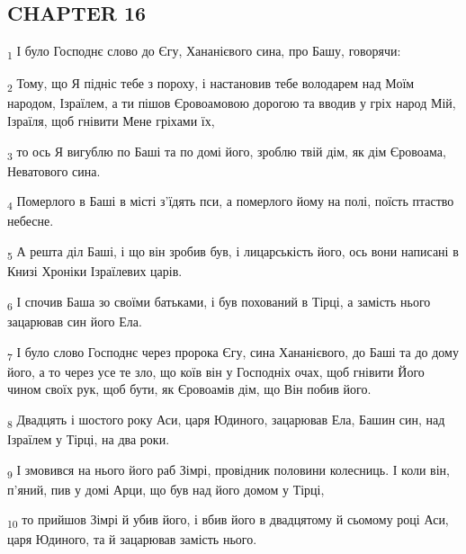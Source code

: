 \subsection{CHAPTER 16}
\begin{tcolorbox}
\textsubscript{1} І було Господнє слово до Єгу, Хананієвого сина, про Башу, говорячи:
\end{tcolorbox}
\begin{tcolorbox}
\textsubscript{2} Тому, що Я підніс тебе з пороху, і настановив тебе володарем над Моїм народом, Ізраїлем, а ти пішов Єровоамовою дорогою та вводив у гріх народ Мій, Ізраїля, щоб гнівити Мене гріхами їх,
\end{tcolorbox}
\begin{tcolorbox}
\textsubscript{3} то ось Я вигублю по Баші та по домі його, зроблю твій дім, як дім Єровоама, Неватового сина.
\end{tcolorbox}
\begin{tcolorbox}
\textsubscript{4} Померлого в Баші в місті з'їдять пси, а померлого йому на полі, поїсть птаство небесне.
\end{tcolorbox}
\begin{tcolorbox}
\textsubscript{5} А решта діл Баші, і що він зробив був, і лицарськість його, ось вони написані в Книзі Хроніки Ізраїлевих царів.
\end{tcolorbox}
\begin{tcolorbox}
\textsubscript{6} І спочив Баша зо своїми батьками, і був похований в Тірці, а замість нього зацарював син його Ела.
\end{tcolorbox}
\begin{tcolorbox}
\textsubscript{7} І було слово Господнє через пророка Єгу, сина Хананієвого, до Баші та до дому його, а то через усе те зло, що коїв він у Господніх очах, щоб гнівити Його чином своїх рук, щоб бути, як Єровоамів дім, що Він побив його.
\end{tcolorbox}
\begin{tcolorbox}
\textsubscript{8} Двадцять і шостого року Аси, царя Юдиного, зацарював Ела, Башин син, над Ізраїлем у Тірці, на два роки.
\end{tcolorbox}
\begin{tcolorbox}
\textsubscript{9} І змовився на нього його раб Зімрі, провідник половини колесниць. І коли він, п'яний, пив у домі Арци, що був над його домом у Тірці,
\end{tcolorbox}
\begin{tcolorbox}
\textsubscript{10} то прийшов Зімрі й убив його, і вбив його в двадцятому й сьомому році Аси, царя Юдиного, та й зацарював замість нього.
\end{tcolorbox}
